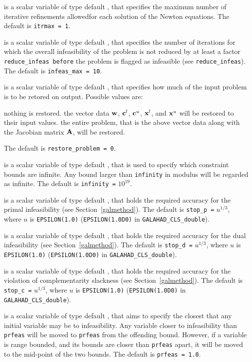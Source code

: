 \documentclass{galahad}
\newcommand{\libraryname}{GALAHAD}
\newcommand{\packagename}{CLS}
\newcommand{\fullpackagename}{\libraryname\_\packagename}
\begin{document}
\begin{description}
 is a scalar variable of type default \integer, that specifies 
the maximum number of iterative refinements allowedfor each solution of
the Newton equations.
The default is {\tt itrmax = 1}.

 is a scalar variable of type default \integer, that specifies
the number of iterations for which the overall infeasibility
of the problem is not reduced by at least a factor {\tt reduce\_infeas
before} the problem is flagged as infeasible (see {\tt reduce\_infeas}).
The default is {\tt infeas\_max = 10}.

 is a scalar variable of type default \integer, that 
specifies how much of the input problem is to be retored on output. 
Possible values are:
\begin{description}
 nothing is restored. 
 the vector data ${\mathbf{w}}$, 
   ${\mathbf{c}}^{l}$, ${\mathbf{c}}^{u}$, ${\mathbf{x}}^{l}$, and ${\mathbf{x}}^{u}$ 
   will be restored to their input values.
 the entire problem, that is the above vector data along with 
the Jacobian matrix ${\mathbf{A}}$, will be restored.
\end{description}
The default is {\tt restore\_problem = 0}.

 is a scalar variable of type default \realdp, that is used to
specify which constraint bounds are infinite.
Any bound larger than {\tt infinity} in modulus will be regarded as infinite.
The default is {\tt infinity =} $10^{19}$.

 is a scalar variable of type default \realdp, that holds the
required accuracy for the primal infeasibility (see Section~\ref{galmethod}).
The default is {\tt stop\_p =} $u^{1/3}$,
where $u$ is {\tt EPSILON(1.0)} ({\tt EPSILON(1.0D0)} in 
{\tt \fullpackagename\_double}).

 is a scalar variable of type default 
\realdp, that holds the
required accuracy for the dual infeasibility (see Section~\ref{galmethod}).
The default is {\tt stop\_d =} $u^{1/3}$,
where $u$ is {\tt EPSILON(1.0)} ({\tt EPSILON(1.0D0)} in 
{\tt \fullpackagename\_double}).

 is a scalar variable of type default 
\realdp, that holds the
required accuracy for the violation of complementarity slackness 
(see Section~\ref{galmethod}).
The default is {\tt stop\_c =} $u^{1/3}$,
where $u$ is {\tt EPSILON(1.0)} ({\tt EPSILON(1.0D0)} in 
{\tt \fullpackagename\_double}).

 is a scalar variable of type default \realdp, that aims to specify
the closest that any initial variable may be to infeasibility. Any variable
closer to infeasibility than {\tt prfeas} will be moved to {\tt prfeas} 
from the offending bound. However, if a variable is range bounded, and its 
bounds are closer than {\tt prfeas} apart, it will be moved to the 
mid-point of the two bounds.
The default is {\tt prfeas = 1.0}.


\end{description}
\end{document}
